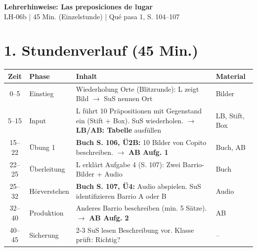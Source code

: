 \documentclass[11pt, a4paper]{article}
\newcommand{\fachfarbe}{spanisch}
\newcommand{\thema}{Las preposiciones de lugar}
\newcommand{\sequenz}{06}
\newcommand{\block}{b}
\newcommand{\dauer}{45 Min. (Einzelstunde)}
\begin{document}

\begin{center}
    {\Large\bfseries\textcolor{\fachfarbe}{Lehrerhinweise: \thema}}\\[0.3em]
    {\normalsize LH-\sequenz\block{} | \dauer{} | Qué pasa 1, S. 104--107}
\end{center}

\vspace{10pt}


\section*{1. Stundenverlauf (45 Min.)}

\begin{tabularx}{\textwidth}{|c|l|X|l|}
\hline
\textbf{Zeit} & \textbf{Phase} & \textbf{Inhalt} & \textbf{Material} \\
\hline
0--5 & Einstieg & Wiederholung Orte (Blitzrunde): L zeigt Bild $\rightarrow$ SuS nennen Ort & Bilder \\
\hline
5--15 & Input & L führt 10 Präpositionen mit Gegenstand ein (Stift + Box). SuS wiederholen. $\rightarrow$ \textbf{LB/AB: Tabelle} ausfüllen & LB, Stift, Box \\
\hline
15--22 & Übung 1 & \textbf{Buch S. 106, Ü2B:} 10 Bilder von Copito beschreiben. $\rightarrow$ \textbf{AB Aufg. 1} & Buch, AB \\
\hline
22--25 & Überleitung & L erklärt Aufgabe 4 (S. 107): Zwei Barrio-Bilder + Audio & Buch \\
\hline
25--32 & Hörverstehen & \textbf{Buch S. 107, Ü4:} Audio abspielen. SuS identifizieren Barrio A oder B & Audio \\
\hline
32--40 & Produktion & Anderes Barrio beschreiben (min. 5 Sätze). $\rightarrow$ \textbf{AB Aufg. 2} & AB \\
\hline
40--45 & Sicherung & 2-3 SuS lesen Beschreibung vor. Klasse prüft: Richtig? & -- \\
\hline
\end{tabularx}

\end{document}
